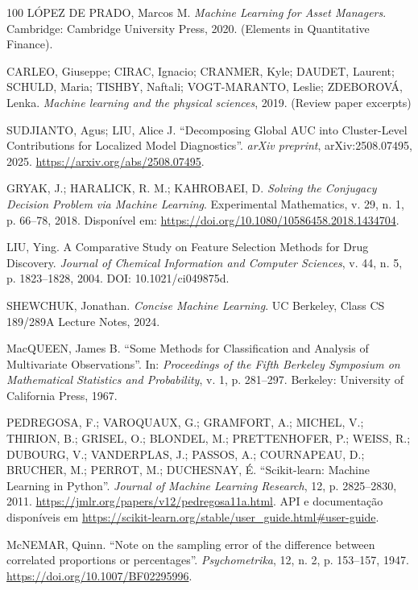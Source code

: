 \documentclass[msc]{on} %
\begin{document}
\begin{thebibliography}{100}
 LÓPEZ DE PRADO, Marcos M. \textit{Machine Learning for Asset Managers}. Cambridge: Cambridge University Press, 2020. (Elements in Quantitative Finance).

 CARLEO, Giuseppe; CIRAC, Ignacio; CRANMER, Kyle; DAUDET, Laurent; SCHULD, Maria; TISHBY, Naftali; VOGT-MARANTO, Leslie; ZDEBOROVÁ, Lenka. \textit{Machine learning and the physical sciences}, 2019. (Review paper excerpts)

 SUDJIANTO, Agus; LIU, Alice J. ``Decomposing Global AUC into Cluster-Level Contributions for Localized Model Diagnostics''. \emph{arXiv preprint}, arXiv:2508.07495, 2025. \url{https://arxiv.org/abs/2508.07495}.

 GRYAK, J.; HARALICK, R. M.; KAHROBAEI, D. \textit{Solving the Conjugacy Decision Problem via Machine Learning}. Experimental Mathematics, v. 29, n. 1, p. 66–78, 2018. Disponível em: \url{https://doi.org/10.1080/10586458.2018.1434704}.

 LIU, Ying. A Comparative Study on Feature Selection Methods for Drug Discovery. \textit{Journal of Chemical Information and Computer Sciences}, v. 44, n. 5, p. 1823–1828, 2004. DOI: 10.1021/ci049875d.

 SHEWCHUK, Jonathan. \textit{Concise Machine Learning}. UC Berkeley, Class CS 189/289A Lecture Notes, 2024.

 MacQUEEN, James B. ``Some Methods for Classification and Analysis of Multivariate Observations''. In: \emph{Proceedings of the Fifth Berkeley Symposium on Mathematical Statistics and Probability}, v. 1, p. 281--297. Berkeley: University of California Press, 1967.

PEDREGOSA, F.; VAROQUAUX, G.; GRAMFORT, A.; MICHEL, V.; THIRION, B.; GRISEL, O.; BLONDEL, M.; PRETTENHOFER, P.; WEISS, R.; DUBOURG, V.; VANDERPLAS, J.; PASSOS, A.; COURNAPEAU, D.; BRUCHER, M.; PERROT, M.; DUCHESNAY, É. ``Scikit-learn: Machine Learning in Python''. \emph{Journal of Machine Learning Research}, 12, p. 2825--2830, 2011. \url{https://jmlr.org/papers/v12/pedregosa11a.html}. API e documentação disponíveis em \url{https://scikit-learn.org/stable/user_guide.html#user-guide}.

McNEMAR, Quinn. ``Note on the sampling error of the difference between correlated proportions or percentages''. \emph{Psychometrika}, 12, n. 2, p. 153--157, 1947. \url{https://doi.org/10.1007/BF02295996}.


\end{thebibliography}
\end{document}
